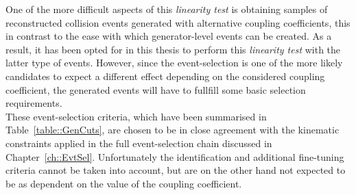 One of the more difficult aspects of this \textit{linearity test} is obtaining samples of reconstructed collision events generated with alternative coupling coefficients, this in contrast to the ease with which generator-level events can be created. As a result, it has been opted for in this thesis to perform this \textit{linearity test} with the latter type of events.
However, since the event-selection is one of the more likely candidates to expect a different effect depending on the considered coupling coefficient, the generated events will have to fullfill some basic selection requirements.
\\
%
These event-selection criteria, which have been summarised in Table~\ref{table::GenCuts}, are chosen to be in close agreement with the kinematic constraints applied in the full event-selection chain discussed in Chapter~\ref{ch::EvtSel}. Unfortunately the identification and additional fine-tuning criteria cannot be taken into account, but are on the other hand not expected to be as dependent on the value of the coupling coefficient.
